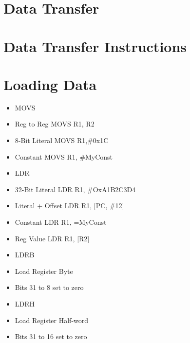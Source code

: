 \section{Data Transfer}

\section*{Data Transfer Instructions}
\section*{Loading Data}
\begin{itemize}
  \item MOVS
  \item Reg to Reg MOVS R1, R2
  \item 8-Bit Literal MOVS R1,\#0x1C
  \item Constant MOVS R1, \#MyConst
  \item LDR
  \item 32-Bit Literal LDR R1, \#OxA1B2C3D4
  \item Literal + Offset LDR R1, [PC, \#12]
  \item Constant LDR R1, =MyConst
  \item Reg Value LDR R1, [R2]
  \item LDRB
  \item Load Register Byte
  \item Bits 31 to 8 set to zero
  \item LDRH
  \item Load Register Half-word
  \item Bits 31 to 16 set to zero
\end{itemize}

